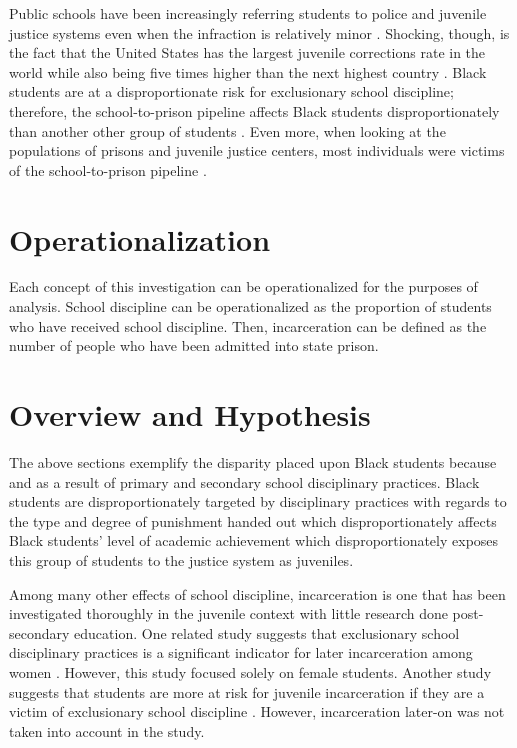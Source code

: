\documentclass[12pt]{article}
\begin{document}
Public schools have been increasingly referring students to police and juvenile justice systems even when the infraction is relatively minor \cite{Wilson2014}. Shocking, though, is the fact that the United States has the largest juvenile corrections rate in the world while also being five times higher than the next highest country \cite{Aizer2015}. Black students are at a disproportionate risk for exclusionary school discipline; therefore, the school-to-prison pipeline affects Black students disproportionately than another other group of students \cite{Skiba2014}. Even more, when looking at the populations of prisons and juvenile justice centers, most individuals were victims of the school-to-prison pipeline \cite{Wald2003}. 



\section*{Operationalization}
Each concept of this investigation can be operationalized for the purposes of analysis. School discipline can be operationalized as the proportion of students who have received school discipline. Then, incarceration can be defined as the number of people who have been admitted into state prison. 



\section*{Overview and Hypothesis}
The above sections exemplify the disparity placed upon Black students because and as a result of primary and secondary school disciplinary practices. Black students are disproportionately targeted by disciplinary practices with regards to the type and degree of punishment handed out which disproportionately affects Black students' level of academic achievement which disproportionately exposes this group of students to the justice system as juveniles. 

Among many other effects of school discipline, incarceration is one that has been investigated thoroughly in the juvenile context with little research done post-secondary education. One related study suggests that exclusionary school disciplinary practices is a significant indicator for later incarceration among women \cite{William2001}. However, this study focused solely on female students. Another study suggests that students are more at risk for juvenile incarceration if they are a victim of exclusionary school discipline \cite{Monahan2014}. However, incarceration later-on was not taken into account in the study.
\end{document}
